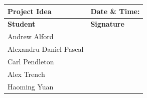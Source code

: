 \documentclass[11pt]{article}
\begin{document}
\begin{table}[H]
\centering
\begin{tabular}{|l|l|}
\hline
\textbf{Project Idea} & \textbf{Date \& Time:} \phantom{This text will be invisible} \\ \hline
\textbf{Student} & \textbf{Signature}     \\ \hline
Andrew Alford           &               \\ \hline
Alexandru-Daniel Pascal &               \\ \hline
Carl Pendleton          &               \\ \hline
Alex Trench             &               \\ \hline
Haoming Yuan            &               \\ \hline
\end{tabular}
\end{table}
\end{document}
